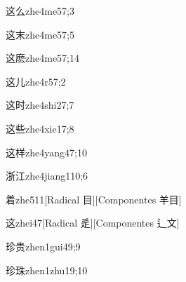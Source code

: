 \begin{verbete}{这么}{zhe4me5}{7;3}
\end{verbete}

\begin{verbete}{这末}{zhe4me5}{7;5}
\end{verbete}

\begin{verbete}{这麽}{zhe4me5}{7;14}
\end{verbete}

\begin{verbete}{这儿}{zhe4r5}{7;2}
\end{verbete}

\begin{verbete}{这时}{zhe4shi2}{7;7}
\end{verbete}

\begin{verbete}{这些}{zhe4xie1}{7;8}
\end{verbete}

\begin{verbete}{这样}{zhe4yang4}{7;10}
\end{verbete}

\begin{verbete}{浙江}{zhe4jiang1}{10;6}
\end{verbete}

\begin{verbete}{着}{zhe5}{11}[Radical 目][Componentes 羊目]
\end{verbete}

\begin{verbete}{这}{zhei4}{7}[Radical 辵][Componentes 辶文]
\end{verbete}

\begin{verbete}{珍贵}{zhen1gui4}{9;9}
\end{verbete}

\begin{verbete}{珍珠}{zhen1zhu1}{9;10}
\end{verbete}

